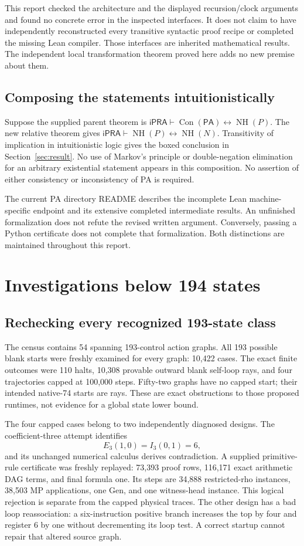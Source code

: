 \documentclass[11pt]{article}
\newcommand{\ipra}{\mathsf{iPRA}}
\newcommand{\pa}{\mathsf{PA}}
\newcommand{\NH}{\operatorname{NH}}
\newcommand{\Con}{\operatorname{Con}}
\begin{document}
This report checked the architecture and the displayed recursion/clock
arguments and found no concrete error in the inspected interfaces. It
does not claim to have independently reconstructed every transitive
syntactic proof recipe or completed the missing Lean compiler. Those
interfaces are inherited mathematical results. The independent local
transformation theorem proved here adds no new premise about them.

\subsection{Composing the statements intuitionistically}
Suppose the supplied parent theorem is
\(\ipra\vdash\Con(\pa)\leftrightarrow\NH(P)\).
The new relative theorem gives
\(\ipra\vdash\NH(P)\leftrightarrow\NH(N)\).
Transitivity of implication in intuitionistic logic gives the boxed
conclusion in Section~\ref{sec:result}. No use of Markov's principle or
double-negation elimination for an arbitrary existential statement
appears in this composition. No assertion of either consistency or
inconsistency of PA is required.

The current PA directory README describes the incomplete Lean
machine-specific endpoint and its extensive completed intermediate
results. An unfinished formalization does not refute the revised
written argument. Conversely, passing a Python certificate does not
complete that formalization. Both distinctions are maintained throughout
this report.

\section{Investigations below 194 states}
\label{sec:search}

\subsection{Rechecking every recognized 193-state class}
The census contains 54 spanning 193-control action graphs. All 193
possible blank starts were freshly examined for every graph: 10,422
cases. The exact finite outcomes were 110 halts, 10,308 provable outward
blank self-loop rays, and four trajectories capped at 100,000 steps.
Fifty-two graphs have no capped start; their intended native-74 starts
are rays. These are exact obstructions to those proposed runtimes,
not evidence for a global state lower bound.

The four capped cases belong to two independently diagnosed designs.
The coefficient-three attempt identifies
\[
 E_3(1,0)=I_3(0,1)=6,
\]
and its unchanged numerical calculus derives contradiction. A supplied
primitive-rule certificate was freshly replayed: 73,393 proof rows,
116,171 exact arithmetic DAG terms, and final formula one. Its steps
are 34,888 restricted-rho instances, 38,503 MP applications, one Gen,
and one witness-head instance. This logical rejection is separate from
the capped physical traces. The other design has a bad loop
reassociation: a six-instruction positive branch increases the top by
four and register 6 by one without decrementing its loop test. A correct
startup cannot repair that altered source graph.
\end{document}
